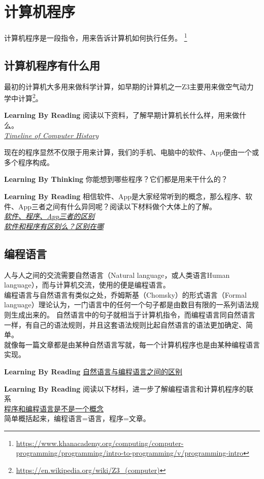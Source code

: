 \chapter{计算机程序}
计算机程序是一段指令，用来告诉计算机如何执行任务。
\footnote{\url{https://www.khanacademy.org/computing/computer-programming/programming/intro-to-programming/v/programming-intro}}
\section{计算机程序有什么用}
最初的计算机大多用来做科学计算，如早期的计算机之一Z3主要用来做空气动力学中计算\footnote{\url{https://en.wikipedia.org/wiki/Z3_(computer)}}。

\begin{paperbox}{\textbf{Learning By Reading}\startwo}
阅读以下资料，了解早期计算机长什么样，用来做什么。\\
\href{http://www.computerhistory.org/timeline/computers/}{\textit{Timeline of Computer History}}
\end{paperbox}
现在的程序显然不仅限于用来计算，我们的手机、电脑中的软件、App便由一个或多个程序构成。
\begin{paperbox}{\textbf{Learning By Thinking}\starfour}
你能想到哪些程序？它们都是用来干什么的？
\end{paperbox}
\begin{paperbox}{\textbf{Learning By Reading}\startwo}
相信软件、App是大家经常听到的概念，那么程序、软件、App三者之间有什么异同呢？阅读以下材料做个大体上的了解。\\
\href{https://teamtreehouse.com/community/the-difference-between-application-program-software}{\textit{软件、程序、App三者的区别}}\\
\href{https://www.guokr.com/question/544735/}{\textit{软件和程序有区别么？区别在哪}}
\end{paperbox}
\section{编程语言}
人与人之间的交流需要自然语言（Natural language，或人类语言Human language），而与计算机交流，使用的便是编程语言。\\
编程语言与自然语言有类似之处，乔姆斯基（Chomsky）的形式语言（Formal language）理论认为，一门语言中的任何一个句子都是由数目有限的一系列语法规则生成出来的。
自然语言中的句子就相当于计算机指令，而编程语言同自然语言一样，有自己的语法规则，并且这套语法规则比起自然语言的语法更加确定、简单。\\
就像每一篇文章都是由某种自然语言写就，每一个计算机程序也是由某种编程语言实现。
\begin{paperbox}{\textbf{Learning By Reading}\starthree}
\href{https://www.quora.com/Whats-the-difference-between-natural-languages-and-programming-languages}{自然语言与编程语言之间的区别}
\end{paperbox}
\begin{paperbox}{\textbf{Learning By Reading}\starone}
阅读以下材料，进一步了解编程语言和计算机程序的联系\\
\href{https://zhidao.baidu.com/question/96230010.html}{程序和编程语言是不是一个概念}\\
简单概括起来，编程语言=语言，程序=文章。
\end{paperbox}
